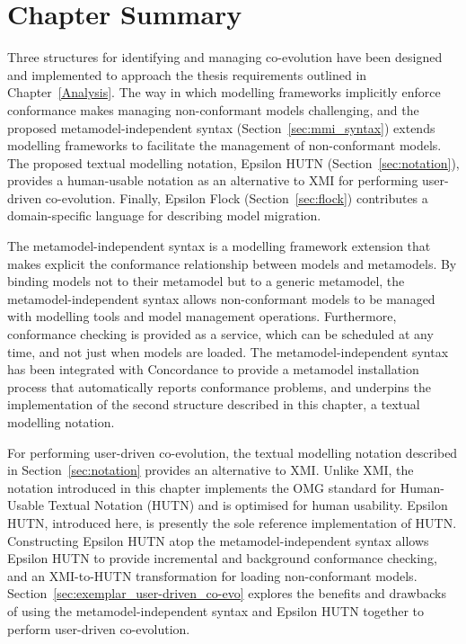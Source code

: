 





\section{Chapter Summary}
Three structures for identifying and managing co-evolution have been designed and implemented to approach the thesis requirements outlined in Chapter~\ref{Analysis}. The way in which modelling frameworks implicitly enforce conformance makes managing non-conformant models challenging, and the proposed metamodel-independent syntax (Section~\ref{sec:mmi_syntax}) extends modelling frameworks to facilitate the management of non-conformant models. The proposed textual modelling notation, Epsilon HUTN (Section~\ref{sec:notation}), provides a human-usable notation as an alternative to XMI for performing user-driven co-evolution. Finally, Epsilon Flock (Section~\ref{sec:flock}) contributes a domain-specific language for describing model migration.

The metamodel-independent syntax is a modelling framework extension that makes explicit the conformance relationship between models and metamodels. By binding models not to their metamodel but to a generic metamodel, the metamodel-independent syntax allows non-conformant models to be managed with modelling tools and model management operations. Furthermore, conformance checking is provided as a service, which can be scheduled at any time, and not just when models are loaded. The metamodel-independent syntax has been integrated with Concordance \cite{rose10concordance} to provide a metamodel installation process that automatically reports conformance problems, and underpins the implementation of the second structure described in this chapter, a textual modelling notation.

For performing user-driven co-evolution, the textual modelling notation described in Section~\ref{sec:notation} provides an alternative to XMI. Unlike XMI, the notation introduced in this chapter implements the OMG standard for Human-Usable Textual Notation (HUTN) \cite{hutn} and is optimised for human usability. Epsilon HUTN, introduced here, is presently the sole reference implementation of HUTN. Constructing Epsilon HUTN atop the metamodel-independent syntax allows Epsilon HUTN to provide incremental and background conformance checking, and an XMI-to-HUTN transformation for loading non-conformant models. Section~\ref{sec:exemplar_user-driven_co-evo} explores the benefits and drawbacks of using the metamodel-independent syntax and Epsilon HUTN together to perform user-driven co-evolution.


